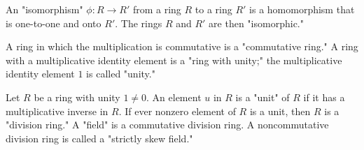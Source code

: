\documentclass[a4paper,11pt]{article}
\begin{document}
\begin{outline}
    An "isomorphism" \(\phi: R \rightarrow R'\) from a ring \(R\) to a ring \(R'\) is a homomorphism that 
    is one-to-one and onto \(R'\). The rings \(R\) and \(R'\) are then "isomorphic."
      
    A ring in which the multiplication is commutative is a "commutative ring." A ring with a multiplicative 
    identity element is a "ring with unity;" the multiplicative identity element \(1\) is called "unity."
      
    Let \(R\) be a ring with unity \(1 \neq 0\). An element \(u\) in \(R\) is a "unit" of \(R\)
    if it has a multiplicative inverse in \(R\). If ever nonzero element of \(R\) is a unit, then \(R\) is a 
    "division ring." A "field" is a commutative division ring. A noncommutative division ring is called a "strictly
    skew field."
      
\end{outline}
\end{document}
